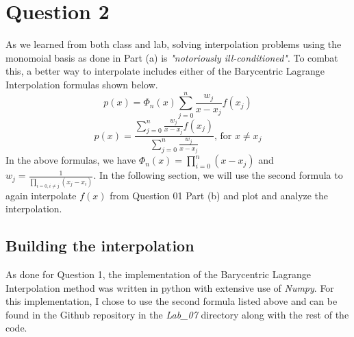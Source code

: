 \documentclass{article}
\begin{document}
\section{Question 2}
As we learned from both class and lab, solving interpolation problems using the monomoial basis as done in Part (a) is \textit{"notoriously ill-conditioned"}. To combat this, a better way to interpolate includes either of the Barycentric Lagrange Interpolation formulas shown below.
\[
p(x) = \Phi_n(x)\sum_{j=0}^n \frac{w_j}{x-x_j}f(x_j)
\]
\[
p(x) = \frac{\sum_{j=0}^n\frac{w_j}{x-x_j}f(x_j)}{\sum_{j=0}^n\frac{w_j}{x-x_j}}\mbox{, for } x\neq x_j
\]
In the above formulas, we have \(\Phi_n(x) = \prod_{i=0}^n(x-x_j)\) and \(w_j=\frac{1}{\prod_{i=0,i\neq j}(x_j-x_i)}\). In the following section, we will use the second formula to again interpolate \(f(x)\) from Question 01 Part (b) and plot and analyze the interpolation.

\subsection{Building the interpolation}
As done for Question 1, the implementation of the Barycentric Lagrange Interpolation method was written in python with extensive use of \textit{Numpy}. For this implementation, I chose to use the second formula listed above and can be found in the Github repository in the \textit{Lab\_07} directory along with the rest of the code.
\end{document}
